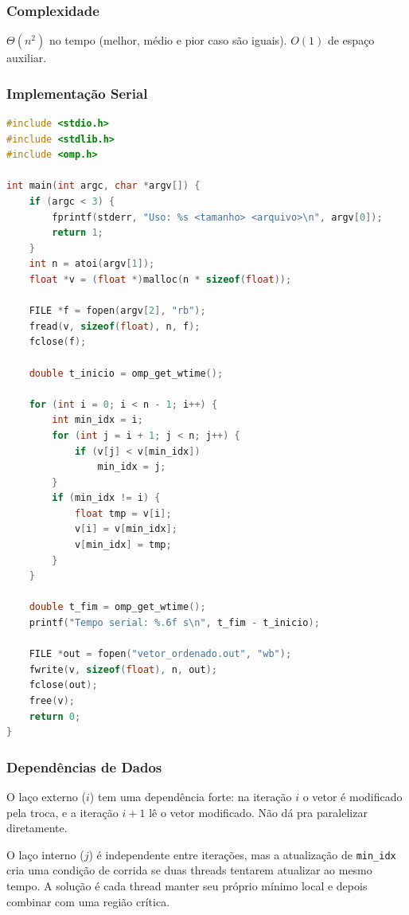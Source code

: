 \documentclass[12pt]{article}
\begin{document}
\subsubsection{Complexidade}

$\Theta(n^2)$ no tempo (melhor, médio e pior caso são iguais). $O(1)$ de espaço auxiliar.

\subsubsection{Implementação Serial}

\begin{lstlisting}[language=C, caption={Selection Sort serial}]
#include <stdio.h>
#include <stdlib.h>
#include <omp.h>

int main(int argc, char *argv[]) {
    if (argc < 3) {
        fprintf(stderr, "Uso: %s <tamanho> <arquivo>\n", argv[0]);
        return 1;
    }
    int n = atoi(argv[1]);
    float *v = (float *)malloc(n * sizeof(float));

    FILE *f = fopen(argv[2], "rb");
    fread(v, sizeof(float), n, f);
    fclose(f);

    double t_inicio = omp_get_wtime();

    for (int i = 0; i < n - 1; i++) {
        int min_idx = i;
        for (int j = i + 1; j < n; j++) {
            if (v[j] < v[min_idx])
                min_idx = j;
        }
        if (min_idx != i) {
            float tmp = v[i];
            v[i] = v[min_idx];
            v[min_idx] = tmp;
        }
    }

    double t_fim = omp_get_wtime();
    printf("Tempo serial: %.6f s\n", t_fim - t_inicio);

    FILE *out = fopen("vetor_ordenado.out", "wb");
    fwrite(v, sizeof(float), n, out);
    fclose(out);
    free(v);
    return 0;
}
\end{lstlisting}

\subsubsection{Dependências de Dados}

O laço externo ($i$) tem uma dependência forte: na iteração $i$ o vetor é modificado pela troca, e a iteração $i+1$ lê o vetor modificado. Não dá pra paralelizar diretamente.

O laço interno ($j$) é independente entre iterações, mas a atualização de \texttt{min\_idx} cria uma condição de corrida se duas threads tentarem atualizar ao mesmo tempo. A solução é cada thread manter seu próprio mínimo local e depois combinar com uma região crítica.
\end{document}
